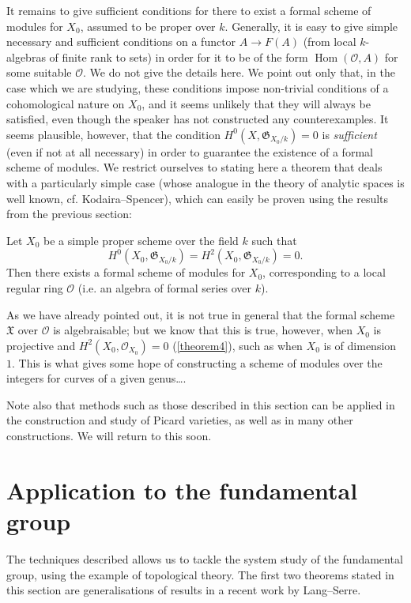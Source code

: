 \documentclass{article}
\theoremstyle{plain}
\newenvironment{theorem}[1]
  {\renewcommand\theinnercustomtheorem{#1}\innercustomtheorem}
  {\endinnercustomtheorem}
\theoremstyle{definition}
\newcommand{\sh}{\mathscr}
\newcommand{\cat}{\mathcal}
\newcommand{\fk}{\mathfrak}
\DeclareMathOperator{\Hom}{Hom}
\newcommand{\oldpage}[1]{\marginpar{\footnotesize$\Big\vert$ \textit{p.~#1}}}
\begin{document}
\oldpage{182-17}
It remains to give sufficient conditions for there to exist a formal scheme of modules for $X_0$, assumed to be proper over $k$.
Generally, it is easy to give simple necessary and sufficient conditions on a functor $A\to F(A)$ (from local $k$-algebras of finite rank to sets) in order for it to be of the form $\Hom(\cat{O},A)$ for some suitable $\cat{O}$.
We do not give the details here.
We point out only that, in the case which we are studying, these conditions impose non-trivial conditions of a cohomological nature on $X_0$, and it seems unlikely that they will always be satisfied, even though the speaker has not constructed any counterexamples.
It seems plausible, however, that the condition $H^0(X,\fk{G}_{X_0/k})=0$ is \emph{sufficient} (even if not at all necessary) in order to guarantee the existence of a formal scheme of modules.
We restrict ourselves to stating here a theorem that deals with a particularly simple case (whose analogue in the theory of analytic spaces is well known, cf. Kodaira--Spencer), which can easily be proven using the results from the previous section:

\begin{theorem}{10}
\label{theorem10}
  Let $X_0$ be a simple proper scheme over the field $k$ such that
  \[
    H^0(X_0,\fk{G}_{X_0/k}) = H^2(X_0,\fk{G}_{X_0/k}) = 0.
  \]
  Then there exists a formal scheme of modules for $X_0$, corresponding to a local regular ring $\cat{O}$ (i.e. an algebra of formal series over $k$).
\end{theorem}

As we have already pointed out, it is not true in general that the formal scheme $\fk{X}$ over $\cat{O}$ is algebraisable;
but we know that this is true, however, when $X_0$ is projective and $H^2(X_0,\sh{O}_{X_0})=0$ (\cref{theorem4}), such as when $X_0$ is of dimension~$1$.
This is what gives some hope of constructing a scheme of modules over the integers for curves of a given genus\ldots{}.

Note also that methods such as those described in this section can be applied in the construction and study of Picard varieties, as well as in many other constructions.
We will return to this soon.


\section{Application to the fundamental group}
\label{section8}

The techniques described allows us to tackle the system study of the fundamental group, using the example of topological theory.
The first two theorems stated in this section are generalisations of results in a recent work by Lang--Serre.
\end{document}
